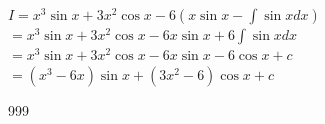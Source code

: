 \documentclass[a4paper]{article}
\newcommand{\dint}{\displaystyle\int}
\begin{document}
$I = x^3 \sin x + 3x^2 \cos x - 6 \left ( x \sin x - \dint  \sin x dx\right )$ \\

$= x^3 \sin x + 3x^2 \cos x - 6x \sin x + 6 \dint \sin x dx$ \\

$= x^3 \sin x + 3x^2 \cos x - 6x \sin x - 6 \cos x + c $ \\

$= \left(x^3 -6x\right)\sin x + \left(3x^2 - 6\right) \cos x + c$

\begin{thebibliography}{999}
\end{thebibliography}
\end{document}
